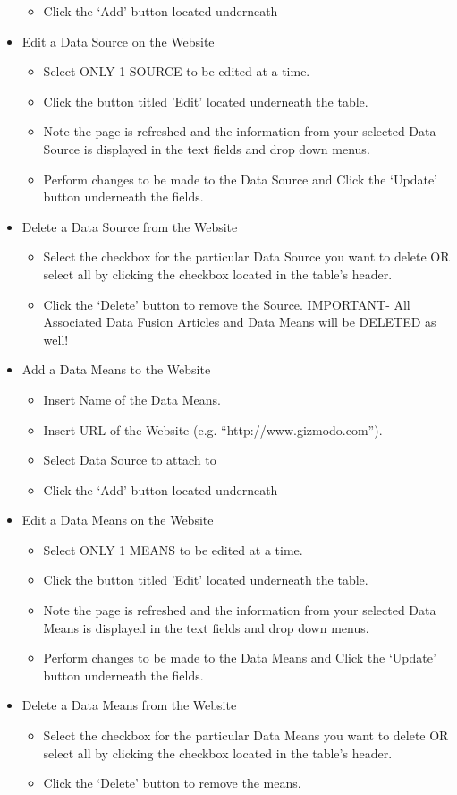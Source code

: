 \documentclass[10pt]{article} %
\begin{document}
\begin{itemize}
\begin{itemize}
	\item Click the ‘Add’ button located underneath
	\end{itemize}
\item Edit a Data Source on the Website
	\begin{itemize}
	\itemindent 10pt
	\item Select ONLY 1 SOURCE to be edited at a time.
	\item Click the button titled ’Edit’ located underneath the table.
	\item Note the page is refreshed and the information from your selected Data Source is displayed in the text fields and drop down menus.
	\item Perform changes to be made to the Data Source and Click the ‘Update’ button underneath the fields.
	\end{itemize}
\item Delete a Data Source from the Website
	\begin{itemize}
	\itemindent 10pt
	\item Select the checkbox for the particular Data Source you want to delete OR select all by clicking the checkbox located in the table’s header.
	\item Click the ‘Delete’ button to remove the Source. IMPORTANT- All Associated Data Fusion Articles and Data Means will be DELETED as well!  
	\end{itemize}
\item Add a Data Means to the Website
	\begin{itemize}
	\itemindent 10pt
	\item Insert Name of the Data Means.
	\item Insert URL of the Website (e.g. “http://www.gizmodo.com”).
	\item Select Data Source to attach to
	\item Click the ‘Add’ button located underneath
	\end{itemize}
\item Edit a Data Means on the Website
	\begin{itemize}
	\itemindent 10pt
	\item Select ONLY 1 MEANS to be edited at a time.
	\item Click the button titled ’Edit’ located underneath the table.
	\item Note the page is refreshed and the information from your selected Data Means is displayed in the text fields and drop down menus.
	\item Perform changes to be made to the Data Means and Click the ‘Update’ button underneath the fields.
	\end{itemize}
\item Delete a Data Means from the Website
	\begin{itemize}
	\itemindent 10pt
	\item Select the checkbox for the particular Data Means you want to delete OR select all by clicking the checkbox located in the table’s header.
	\item Click the ‘Delete’ button to remove the means.
	\end{itemize}
\end{itemize}
\end{document}
